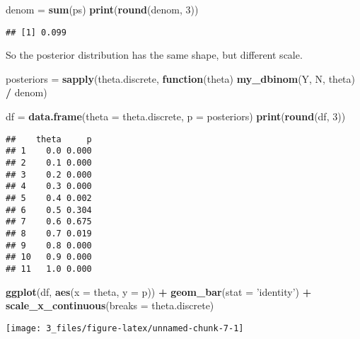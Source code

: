 \documentclass[]{article}
\newenvironment{Shaded}{\begin{snugshade}}{\end{snugshade}}
\newcommand{\ControlFlowTok}[1]{\textcolor[rgb]{0.13,0.29,0.53}{\textbf{#1}}}
\newcommand{\DataTypeTok}[1]{\textcolor[rgb]{0.13,0.29,0.53}{#1}}
\newcommand{\DecValTok}[1]{\textcolor[rgb]{0.00,0.00,0.81}{#1}}
\newcommand{\KeywordTok}[1]{\textcolor[rgb]{0.13,0.29,0.53}{\textbf{#1}}}
\newcommand{\NormalTok}[1]{#1}
\newcommand{\OperatorTok}[1]{\textcolor[rgb]{0.81,0.36,0.00}{\textbf{#1}}}
\newcommand{\StringTok}[1]{\textcolor[rgb]{0.31,0.60,0.02}{#1}}
\begin{document}
\begin{Shaded}
\begin{Highlighting}[]
\NormalTok{denom =}\StringTok{ }\KeywordTok{sum}\NormalTok{(ps)}
\KeywordTok{print}\NormalTok{(}\KeywordTok{round}\NormalTok{(denom, }\DecValTok{3}\NormalTok{))}
\end{Highlighting}
\end{Shaded}

\begin{verbatim}
## [1] 0.099
\end{verbatim}

So the posterior distribution has the same shape, but different scale.

\begin{Shaded}
\begin{Highlighting}[]
\NormalTok{posteriors =}\StringTok{ }\KeywordTok{sapply}\NormalTok{(theta.discrete, }\ControlFlowTok{function}\NormalTok{(theta) }\KeywordTok{my_dbinom}\NormalTok{(Y, N, theta) }\OperatorTok{/}\StringTok{ }\NormalTok{denom)}

\NormalTok{df =}\StringTok{ }\KeywordTok{data.frame}\NormalTok{(}\DataTypeTok{theta =}\NormalTok{ theta.discrete, }\DataTypeTok{p =}\NormalTok{ posteriors)}
\KeywordTok{print}\NormalTok{(}\KeywordTok{round}\NormalTok{(df, }\DecValTok{3}\NormalTok{))}
\end{Highlighting}
\end{Shaded}

\begin{verbatim}
##    theta     p
## 1    0.0 0.000
## 2    0.1 0.000
## 3    0.2 0.000
## 4    0.3 0.000
## 5    0.4 0.002
## 6    0.5 0.304
## 7    0.6 0.675
## 8    0.7 0.019
## 9    0.8 0.000
## 10   0.9 0.000
## 11   1.0 0.000
\end{verbatim}

\begin{Shaded}
\begin{Highlighting}[]
\KeywordTok{ggplot}\NormalTok{(df, }\KeywordTok{aes}\NormalTok{(}\DataTypeTok{x =}\NormalTok{ theta, }\DataTypeTok{y =}\NormalTok{ p)) }\OperatorTok{+}
\StringTok{  }\KeywordTok{geom_bar}\NormalTok{(}\DataTypeTok{stat =} \StringTok{'identity'}\NormalTok{) }\OperatorTok{+}
\StringTok{  }\KeywordTok{scale_x_continuous}\NormalTok{(}\DataTypeTok{breaks =}\NormalTok{ theta.discrete)}
\end{Highlighting}
\end{Shaded}

\begin{center}\texttt{[image: 3\_files/figure-latex/unnamed-chunk-7-1]} \end{center}
\end{document}
